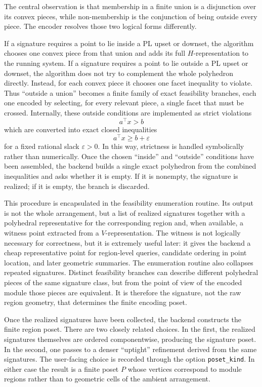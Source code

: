 \documentclass[11pt]{article}
\theoremstyle{definition}
\theoremstyle{remark}
\begin{document}
The central observation is that membership in a finite union is a disjunction over its convex pieces, while non-membership is the conjunction of being outside every piece.  The encoder resolves those two logical forms differently.

If a signature requires a point to lie inside a PL upset or downset, the algorithm chooses one convex piece from that union and adds its full \(H\)-representation to the running system.  If a signature requires a point to lie outside a PL upset or downset, the algorithm does not try to complement the whole polyhedron directly.  Instead, for each convex piece it chooses one facet inequality to violate.  Thus ``outside a union'' becomes a finite family of exact feasibility branches, each one encoded by selecting, for every relevant piece, a single facet that must be crossed.  Internally, these outside conditions are implemented as strict violations
\[
a^\top x > b
\]
which are converted into exact closed inequalities
\[
a^\top x \geq b + \varepsilon
\]
for a fixed rational slack \(\varepsilon > 0\).  In this way, strictness is handled symbolically rather than numerically.  Once the chosen ``inside'' and ``outside'' conditions have been assembled, the backend builds a single exact polyhedron from the combined inequalities and asks whether it is empty.  If it is nonempty, the signature is realized; if it is empty, the branch is discarded.

This procedure is encapsulated in the feasibility enumeration routine.  Its output is not the whole arrangement, but a list of realized signatures together with a polyhedral representative for the corresponding region and, when available, a witness point extracted from a \(V\)-representation.  The witness is not logically necessary for correctness, but it is extremely useful later: it gives the backend a cheap representative point for region-level queries, candidate ordering in point location, and later geometric summaries.  The enumeration routine also collapses repeated signatures.  Distinct feasibility branches can describe different polyhedral pieces of the same signature class, but from the point of view of the encoded module those pieces are equivalent.  It is therefore the signature, not the raw region geometry, that determines the finite encoding poset.

Once the realized signatures have been collected, the backend constructs the finite region poset.  There are two closely related choices.  In the first, the realized signatures themselves are ordered componentwise, producing the signature poset.  In the second, one passes to a denser ``uptight'' refinement derived from the same signatures.  The user-facing choice is recorded through the option \texttt{poset\_kind}.  In either case the result is a finite poset \(P\) whose vertices correspond to module regions rather than to geometric cells of the ambient arrangement.
\end{document}
